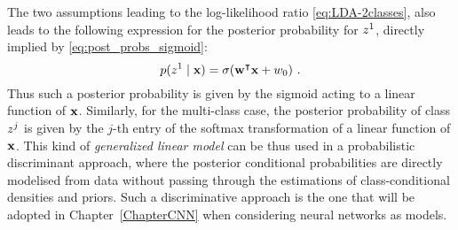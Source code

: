 The two assumptions leading to the log-likelihood ratio \eqref{eq:LDA-2classes}, also leads to the following expression for the posterior probability for $z^1$, directly implied by \eqref{eq:post_probs_sigmoid}: 
\begin{equation}
p(z^1\mid \textbf{x}) = \sigma(\textbf{w}^\intercal \textbf{x} + w_0)\mbox{ .}
\end{equation}
Thus such a posterior probability is given by the sigmoid acting to a linear function of $\textbf{x}$. Similarly, for the multi-class case, the posterior probability of class $z^j$ is given by the $j$-th entry of the softmax transformation of a linear function of $\textbf{x}$. This kind of \emph{generalized linear model} can be thus used in a probabilistic discriminant approach, where the posterior conditional probabilities are directly modelised from data without passing through the estimations of class-conditional densities and priors. Such a discriminative approach is the one that will be adopted in Chapter~\ref{ChapterCNN} when considering neural networks as models.





